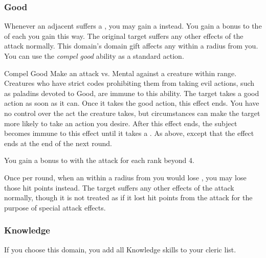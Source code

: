         \subsubsection{Good}
             Whenever an adjacent  suffers a , you may gain a  instead.
            You gain a  bonus to the  of each  you gain this way.
            The original target suffers any other effects of the attack normally.
             This domain's domain gift affects any  within a \areamed radius  from you.
             You can use the \textit{compel good} ability as a standard action.
            \begin{instantability}{Compel Good}
                \rankline
                Make an attack vs. Mental against a creature within \rngmed range.
                Creatures who have strict codes prohibiting them from taking evil actions, such as paladins devoted to Good, are immune to this ability.
                \hit The target takes a good action as soon as it can.
                Once it takes the good action, this effect ends.
                You have no control over the act the creature takes, but circumstances can make the target more likely to take an action you desire.
                After this effect ends, the subject becomes immune to this effect until it takes a .
                \glance As above, except that the effect ends at the end of the next round.

                \rankline
                You gain a  bonus to  with the attack for each rank beyond 4.
            \end{instantability}
             Once per round, when an  within a \areamed radius  from you would lose , you may lose those hit points instead.
            The target suffers any other effects of the attack normally, though it is not treated as if it lost hit points from the attack for the purpose of special attack effects.

        \subsubsection{Knowledge}
            If you choose this domain, you add all Knowledge skills to your cleric  list.

